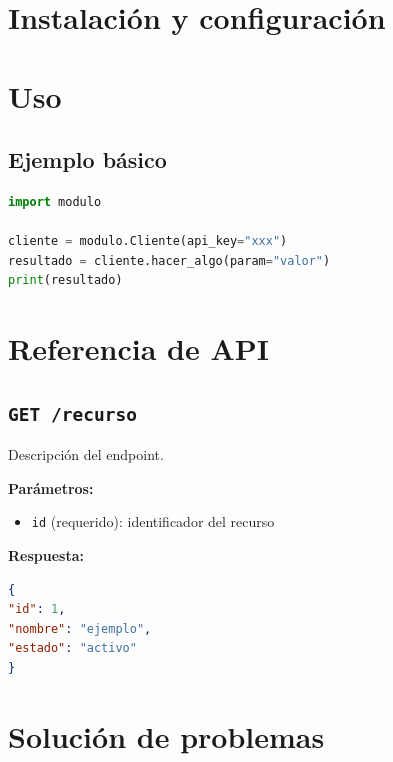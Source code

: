\documentclass[12pt, letterpaper]{article}
\begin{document}


\section{Instalación y configuración}



\section{Uso}

\subsection{Ejemplo básico}

\begin{lstlisting}[language=Python]
import modulo

cliente = modulo.Cliente(api_key="xxx")
resultado = cliente.hacer_algo(param="valor")
print(resultado)
\end{lstlisting}

\section{Referencia de API}

\subsection{\texttt{GET /recurso}}

Descripción del endpoint.

\textbf{Parámetros:}
\begin{itemize}
    \item \texttt{id} (requerido): identificador del recurso
\end{itemize}

\textbf{Respuesta:}
\begin{lstlisting}[language=json]
{
"id": 1,
"nombre": "ejemplo",
"estado": "activo"
}
\end{lstlisting}

\section{Solución de problemas}
\end{document}
